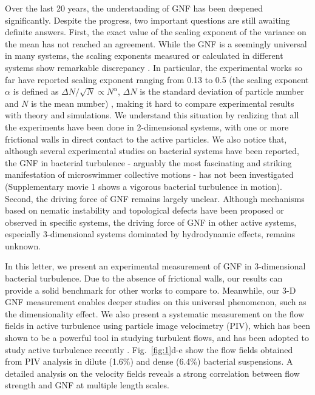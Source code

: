 \documentclass[twocolumn,aps,prl,amsmath,amssymb,longbibliography]{revtex4-2}
\begin{document}
Over the last 20 years, the understanding of GNF has been deepened significantly. Despite the progress, two important questions are still awaiting definite answers.
First, the exact value of the scaling exponent of the variance on the mean has not reached an agreement. While the GNF is a seemingly universal in many systems, the scaling exponents measured or calculated in different systems show remarkable discrepancy \cite{AditiSimha2002, Ramaswamy2003, Narayan2007, Chate2008, Deseigne2010, Zhang2010,
Dey2012, Saintillan2012, Schaller2013, Ngo2014, Nishiguchi2017, Kawaguchi2017, Mahault2019,
Karani2019}. In particular, the experimental works so far have reported scaling exponent ranging from 0.13 to 0.5 (the scaling exponent $\alpha$ is defined as $\Delta N /\sqrt N \propto N^\alpha$, $\Delta N$ is the standard deviation of particle number and $N$ is the mean number)
\cite{Narayan2007, Deseigne2010, Zhang2010, Schaller2013, Nishiguchi2017, Kawaguchi2017, Karani2019}, making it hard to compare experimental results with theory and simulations. We understand this situation by realizing that all the experiments have been done in 2-dimensional systems, with one or more frictional walls in direct contact to the active particles. We also notice that, although several experimental studies on bacterial systems have been reported, the GNF in bacterial turbulence - arguably the most fascinating and striking manifestation of microswimmer collective motions - has not been investigated (Supplementary movie 1 shows a vigorous bacterial turbulence in motion). Second, the driving force of GNF remains largely unclear. Although mechanisms based on nematic instability
\cite{AditiSimha2002, Ramaswamy2003, Narayan2007} and topological defects \cite{Saintillan2008b, Schaller2013} have been proposed or observed in specific systems, the driving force of GNF in other active systems, especially 3-dimensional systems dominated by hydrodynamic effects, remains unknown.


In this letter, we present an experimental measurement of GNF in 3-dimensional bacterial turbulence. Due to the absence of frictional walls, our results can provide a solid benchmark for other works to compare to. Meanwhile, our 3-D GNF measurement enables deeper studies on this universal phenomenon, such as the dimensionality effect. We also present a systematic measurement on the flow fields in active turbulence using particle image velocimetry (PIV), which has been shown to be a powerful tool in studying turbulent flows, and has been adopted to study active turbulence recently
\cite{Ishikawa2011, Wensink2012, Sokolov2012, Sanchez2012, Dunkel2013, Schaller2013, Peng2020}. Fig.~\ref{fig:1}d-e show the flow fields obtained from PIV analysis in dilute (1.6\%) and dense (6.4\%) bacterial suspensions. A detailed analysis on the velocity fields reveals a strong correlation between flow strength and GNF at multiple length scales.
\end{document}
